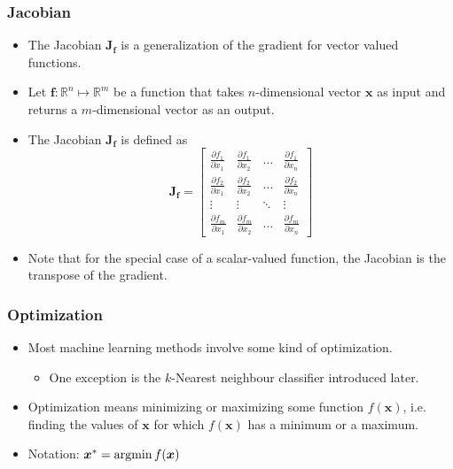 \documentclass[notes]{beamer}          %
\newcommand{\vect}[1]{\bm{#1}}
\newcommand{\field}[1]{\mathbb{#1}}
\newcommand{\R}{\field{R}}
\newcommand{\argmin}{\operatornamewithlimits{argmin}}
\begin{document}
\begin{frame}
\frametitle{Jacobian}

\begin{itemize}
    \item The Jacobian $\vect{J_f}$ is a generalization of the gradient for vector valued functions.
    \item Let $\vect{f}:\R^n \mapsto \R^m $ be a function that takes $n$-dimensional vector $\vect{x}$ as input and returns a $m$-dimensional vector as an output.
    \item The Jacobian $\vect{J_f}$ is defined as
    $$
        \vect{J_f} =
        \begin{bmatrix}
         \frac{\partial f_1}{\partial x_{1}} & \frac{\partial f_1}{\partial x_{2}} & \ldots & \frac{\partial f_1}{\partial x_{n}} \\
          \frac{\partial f_2}{\partial x_{1}} & \frac{\partial f_2}{\partial x_{2}} & \ldots & \frac{\partial f_2}{\partial x_{n}} \\
          \vdots & \vdots & \ddots & \vdots \\
           \frac{\partial f_m}{\partial x_{1}} & \frac{\partial f_m}{\partial x_{2}} & \ldots & \frac{\partial f_m}{\partial x_{n}}
        \end{bmatrix}
    $$
    \item Note that for the special case of a scalar-valued function, the Jacobian is the transpose of the gradient.
\end{itemize}

\end{frame}

\begin{frame}
\frametitle{Optimization}

\begin{itemize}
    \item Most machine learning methods involve some kind of optimization.
    \begin{itemize}
        \item One exception is the $k$-Nearest neighbour classifier introduced later.
    \end{itemize}
    \item Optimization means minimizing or maximizing some function $f(\vect{x})$, i.e. finding the values of $\vect{x}$ for which $f(\vect{x})$ has a minimum or a maximum.
    \item Notation: $\vect{x}^* = \argmin f(\vect{x})$
\end{itemize}
\end{frame}
\end{document}
